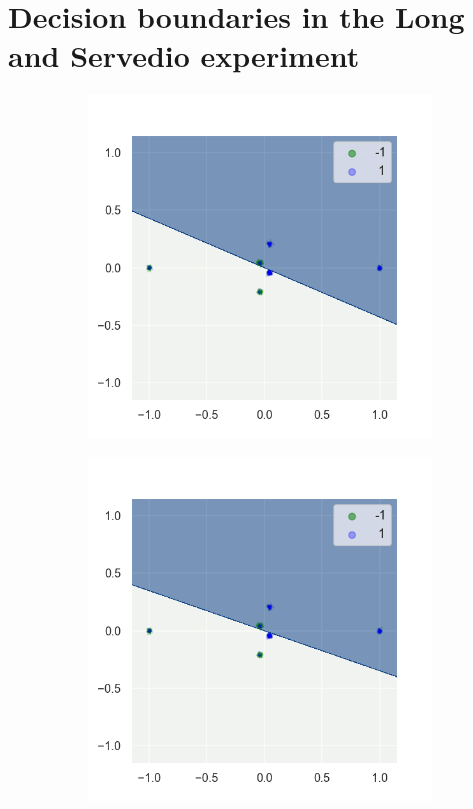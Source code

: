 \newpage
\appendix
\section{Decision boundaries in the Long and Servedio experiment}
\begin{figure}[htp]
\centering
  \begin{subfigure}{0.31\linewidth}
    \includegraphics[width=\columnwidth]{figs/boundaries_Logistic.png}
    \label{fig:logistic}
  \end{subfigure}
  \hfill
  \begin{subfigure}{0.31\linewidth}
        \includegraphics[width=\columnwidth]{figs/boundaries_Huberised.png}

\end{subfigure}
\end{figure}
